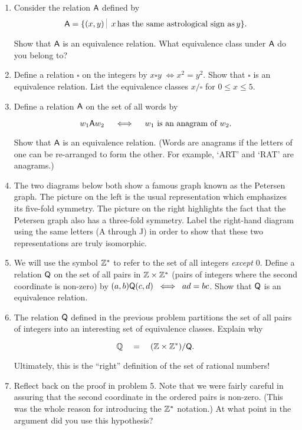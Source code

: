 \begin{enumerate}
\item Consider the relation $\mbox{\textsf A}$ defined by 
\[ \relA = \{ (x,y) \suchthat \; x \, \mbox{has the same astrological sign as} \, y \}. \]

\noindent Show that $\mbox{\textsf A}$ is an equivalence relation.  What equivalence class
under $\mbox{\textsf A}$ do you belong to?
\item Define a relation $\square$ on the integers by $x \square y \; \iff x^2 = y^2$.  Show that $\square$ is an equivalence relation.  List the equivalence
classes $x/\square$ for $0 \leq x \leq 5$.
\item Define a relation $\mbox{\textsf A}$ on the set of all words by

\[ w_1 \mbox{\textsf A} w_2 \quad \iff \quad w_1 \mbox{ is an anagram of } w_2. \]

\noindent Show that $\mbox{\textsf A}$ is an equivalence relation.  (Words are anagrams
if the letters of one can be re-arranged to form the other.  For example, `ART' and `RAT' are anagrams.)
\item The two diagrams below both show a famous graph known as the 
Petersen graph.  The picture on the 
left is the usual representation which emphasizes its five-fold symmetry.  The picture on the right
highlights the fact that the Petersen graph also has a three-fold symmetry.  Label the right-hand diagram
using the same letters (A through J) in order to show that these two representations are truly isomorphic.

\vspace{.2in}

\rule{0pt}{0pt} \hspace{-.75in} 

\vspace{.2in}

\item We will use the symbol ${\mathbb Z}^{\ast}$ to refer to the set of
all integers \emph{except} $0$.  
Define a relation $\mbox{\textsf Q}$ on the set of all pairs in ${\mathbb Z} \times {\mathbb Z}^{\ast}$ (pairs of integers where the second coordinate is non-zero) by
$(a,b) \mbox{\textsf Q} (c,d) \; \iff \; ad=bc$.  Show that $\mbox{\textsf Q}$ is an 
equivalence relation.

\item The relation $\mbox{\textsf Q}$ defined in the previous problem partitions
the set of all pairs of integers into an interesting set of equivalence
classes.  Explain why 

\[ {\mathbb Q} \quad = \quad ({\mathbb Z} \times {\mathbb Z}^{\ast}) / \mbox{\textsf Q}. \]

\noindent Ultimately, this is the ``right'' definition of the set 
of rational numbers!

\item Reflect back on the proof in problem 5.  Note that we were fairly
careful in assuring that the second coordinate in the ordered pairs is
non-zero. (This was the whole reason for introducing the 
${\mathbb Z}^{\ast}$ notation.)  At what point in the argument did you
use this hypothesis?

\end{enumerate} 

